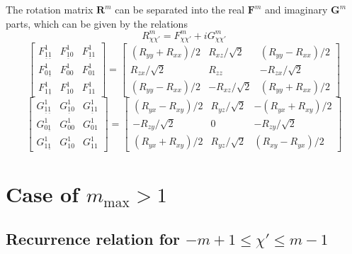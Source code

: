 The rotation matrix $\mathbf{R}^{m}$ can be separated into the real
$\mathbf{F}^{m}$ and imaginary $\mathbf{G}^{m}$ parts, which can
be given by the relations
\begin{equation}
R_{\chi\chi'}^{m}=F_{\chi\chi'}^{m}+iG_{\chi\chi'}^{m}
\end{equation}
\begin{equation}
\left[\begin{array}{ccc}
F_{\underline{1}\underline{1}}^{1} & F_{\underline{1}0}^{1} & F_{\underline{1}1}^{1}\\
F_{0\underline{1}}^{1} & F_{00}^{1} & F_{01}^{1}\\
F_{1\underline{1}}^{1} & F_{10}^{1} & F_{11}^{1}
\end{array}\right]=\left[\begin{array}{ccc}
\left(R_{yy}+R_{xx}\right)/2 & R_{xz}/\sqrt{2} & \left(R_{yy}-R_{xx}\right)/2\\
R_{zx}/\sqrt{2} & R_{zz} & -R_{zx}/\sqrt{2}\\
\left(R_{yy}-R_{xx}\right)/2 & -R_{xz}/\sqrt{2} & \left(R_{yy}+R_{xx}\right)/2
\end{array}\right]
\end{equation}
\begin{equation}
\left[\begin{array}{ccc}
G_{\underline{1}\underline{1}}^{1} & G_{\underline{1}0}^{1} & G_{\underline{1}1}^{1}\\
G_{0\underline{1}}^{1} & G_{00}^{1} & G_{01}^{1}\\
G_{1\underline{1}}^{1} & G_{10}^{1} & G_{11}^{1}
\end{array}\right]=\left[\begin{array}{ccc}
\left(R_{yx}-R_{xy}\right)/2 & R_{yz}/\sqrt{2} & -\left(R_{yx}+R_{xy}\right)/2\\
-R_{zy}/\sqrt{2} & 0 & -R_{zy}/\sqrt{2}\\
\left(R_{yx}+R_{xy}\right)/2 & R_{yz}/\sqrt{2} & \left(R_{xy}-R_{yx}\right)/2
\end{array}\right]
\end{equation}



\section{Case of $m_{\mathrm{max}}>1$}


\subsection{Recurrence relation for $-m+1\leq\chi'\leq m-1$}


